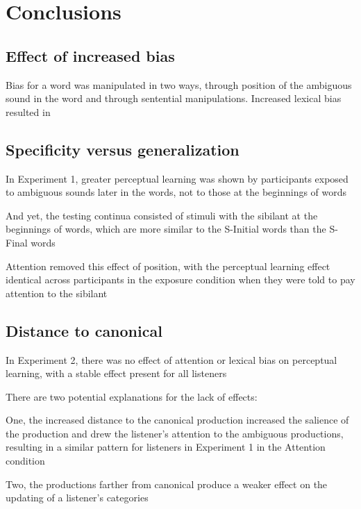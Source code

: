 
\chapter{Conclusions}


\section{Effect of increased bias}

Bias for a word was manipulated in two ways, through position of the ambiguous sound in the word and through sentential manipulations.  Increased lexical bias resulted in 


\section{Specificity versus generalization}

In Experiment 1, greater perceptual learning was shown by participants exposed to ambiguous sounds later in the words, not to those at the beginnings of words

And yet, the testing continua consisted of stimuli with the sibilant at the beginnings of words, which are more similar to the S-Initial words than the S-Final words

Attention removed this effect of position, with the perceptual learning effect identical across participants in the exposure condition when they were told to pay attention to the sibilant

\section{Distance to canonical}

In Experiment 2, there was no effect of attention or lexical bias on perceptual learning, with a stable effect present for all listeners

There are two potential explanations for the lack of effects:

One, the increased distance to the canonical production increased the salience of the production and drew the listener's attention to the ambiguous productions, resulting in a similar pattern for listeners in Experiment 1 in the Attention condition

Two, the productions farther from canonical produce a weaker effect on the updating of a listener's categories

